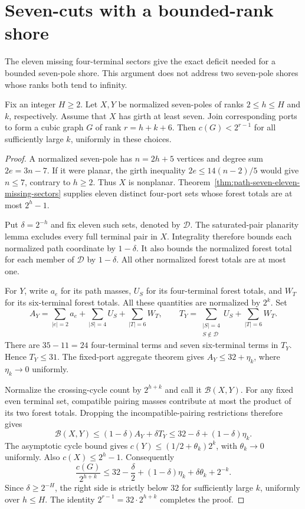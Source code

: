 \section{Seven-cuts with a bounded-rank shore}
\label{sec:path-seven-bounded-shores}

The eleven missing four-terminal sectors give the exact deficit needed for a bounded seven-pole shore.
This argument does not address two seven-pole shores whose ranks both tend to infinity.

\begin{proposition}
\label{prop:path-seven-bounded-quantum}
Fix an integer $H\ge2$.
Let $X,Y$ be normalized seven-poles of ranks $2\le h\le H$ and $k$, respectively.
Assume that $X$ has girth at least seven.
Join corresponding ports to form a cubic graph $G$ of rank $r=h+k+6$.
Then $c(G)<2^{r-1}$ for all sufficiently large $k$, uniformly in these choices.
\end{proposition}

\begin{proof}
A normalized seven-pole has $n=2h+5$ vertices and degree sum $2e=3n-7$.
If it were planar, the girth inequality $2e\le14(n-2)/5$ would give $n\le7$, contrary to $h\ge2$.
Thus $X$ is nonplanar.
Theorem~\ref{thm:path-seven-eleven-missing-sectors} supplies eleven distinct four-port sets whose forest totals are at most $2^h-1$.

Put $\delta=2^{-h}$ and fix eleven such sets, denoted by $\mathcal D$.
The saturated-pair planarity lemma excludes every full terminal pair in $X$.
Integrality therefore bounds each normalized path coordinate by $1-\delta$.
It also bounds the normalized forest total for each member of $\mathcal D$ by $1-\delta$.
All other normalized forest totals are at most one.

For $Y$, write $a_e$ for its path masses, $U_S$ for its four-terminal forest totals, and $W_T$ for its six-terminal forest totals.
All these quantities are normalized by $2^k$.
Set
\[
 A_Y=\sum_{|e|=2}a_e+\sum_{|S|=4}U_S+\sum_{|T|=6}W_T,
 \qquad
 T_Y=\sum_{\substack{|S|=4\\S\notin\mathcal D}}U_S+\sum_{|T|=6}W_T.
\]
There are $35-11=24$ four-terminal terms and seven six-terminal terms in $T_Y$.
Hence $T_Y\le31$.
The fixed-port aggregate theorem gives $A_Y\le32+\eta_k$, where $\eta_k\to0$ uniformly.

Normalize the crossing-cycle count by $2^{h+k}$ and call it $\mathcal B(X,Y)$.
For any fixed even terminal set, compatible pairing masses contribute at most the product of its two forest totals.
Dropping the incompatible-pairing restrictions therefore gives
\[
 \mathcal B(X,Y)
 \le(1-\delta)A_Y+\delta T_Y
 \le32-\delta+(1-\delta)\eta_k.
\]
The asymptotic cycle bound gives $c(Y)\le(1/2+\theta_k)2^k$, with $\theta_k\to0$ uniformly.
Also $c(X)\le2^h-1$.
Consequently
\[
 \frac{c(G)}{2^{h+k}}
 \le32-\frac\delta2+(1-\delta)\eta_k+\delta\theta_k+2^{-k}.
\]
Since $\delta\ge2^{-H}$, the right side is strictly below $32$ for sufficiently large $k$, uniformly over $h\le H$.
The identity $2^{r-1}=32\cdot2^{h+k}$ completes the proof.
\end{proof}

